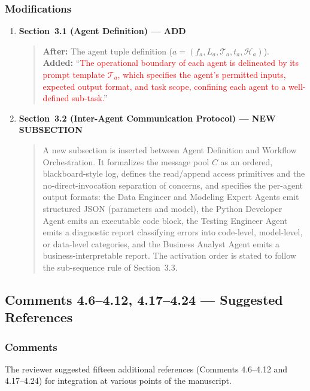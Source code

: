 \documentclass[11pt,a4paper]{article}
\begin{document}
\subsubsection{Modifications}
\begin{enumerate}
\item \textbf{Section~3.1 (Agent Definition) --- ADD}
\begin{quote}
\textbf{After:} The agent tuple definition ($a=(f_a, L_a, \mathcal{T}_a, t_a, \mathcal{H}_a)$).\\[4pt]
\textbf{Added:} ``\textcolor{red}{The operational boundary of each agent is delineated by its prompt template $\mathcal{T}_a$, which specifies the agent's permitted inputs, expected output format, and task scope, confining each agent to a well-defined sub-task.}''
\end{quote}
\item \textbf{Section~3.2 (Inter-Agent Communication Protocol) --- NEW SUBSECTION}
\begin{quote}
A new subsection is inserted between Agent Definition and Workflow Orchestration. It formalizes the message pool $C$ as an ordered, blackboard-style log, defines the read/append access primitives and the no-direct-invocation separation of concerns, and specifies the per-agent output formats: the Data Engineer and Modeling Expert Agents emit structured JSON (parameters and model), the Python Developer Agent emits an executable code block, the Testing Engineer Agent emits a diagnostic report classifying errors into code-level, model-level, or data-level categories, and the Business Analyst Agent emits a business-interpretable report. The activation order is stated to follow the sub-sequence rule of Section~3.3.
\end{quote}
\end{enumerate}

\subsection{Comments 4.6--4.12, 4.17--4.24 --- Suggested References}

\subsubsection{Comments}
The reviewer suggested fifteen additional references (Comments 4.6--4.12 and 4.17--4.24) for integration at various points of the manuscript.
\end{document}
